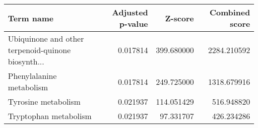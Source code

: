 \begin{tabular}{lrrr}
\toprule
                                         Term name &  Adjusted p-value &    Z-score &  Combined score \\
\midrule
Ubiquinone and other terpenoid-quinone biosynth... &          0.017814 & 399.680000 &     2284.210592 \\
                          Phenylalanine metabolism &          0.017814 & 249.725000 &     1318.679916 \\
                               Tyrosine metabolism &          0.021937 & 114.051429 &      516.948820 \\
                             Tryptophan metabolism &          0.021937 &  97.331707 &      426.234286 \\
\bottomrule
\end{tabular}
